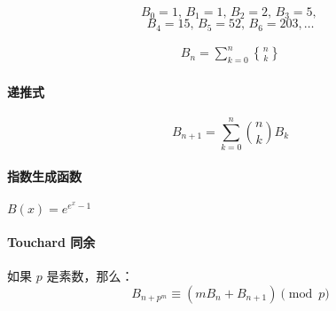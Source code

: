 $$B_0 = 1,\, B_1 = 1,\, B_2 = 2,\, B_3 = 5,\,$$
$$B_4 = 15,\, B_5 = 52,\, B_6 = 203, \dots$$

$$\begin{aligned}B_n = \sum_{k = 0} ^ n {n\brace k}\end{aligned}$$

\paragraph{递推式}
$$ B_{n + 1} = \sum_{k = 0} ^n {n\choose k} B_k $$

\paragraph{指数生成函数} $B(x) = e^{e^x - 1}$

\paragraph{Touchard 同余} 如果 $p$ 是素数，那么：
$$ B_{n + p^m} \equiv (m B_n + B_{n + 1}) \pmod p $$

